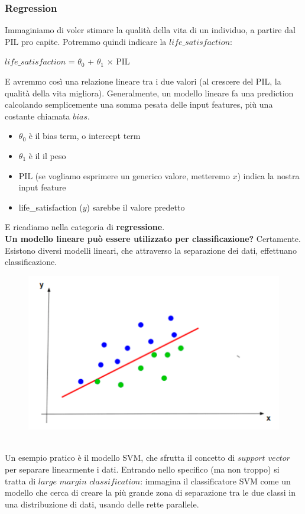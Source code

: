 \newpage

\subsubsection{Regression}
Immaginiamo di voler stimare la qualità della vita di un individuo, a partire dal PIL pro capite. Potremmo quindi indicare la $life\_satisfaction$:
\begin{center}
    $life\_satisfaction$ = $\theta_0$ + $\theta_1$ $\times$ PIL
\end{center}
E avremmo così una relazione lineare tra i due valori (al crescere del PIL, la qualità della vita migliora). Generalmente, un modello lineare fa una prediction calcolando semplicemente una somma pesata delle input features, più una costante chiamata $bias$. 
\begin{itemize}
    \item $\theta_0$ è il bias term, o intercept term
    \item $\theta_1$ è il il peso
    \item PIL (se vogliamo esprimere un generico valore, metteremo $x$) indica la nostra input feature
    \item life\_satisfaction ($y$) sarebbe il valore predetto
\end{itemize}
E ricadiamo nella categoria di \textbf{regressione}.
\\
\textbf{Un modello lineare può essere utilizzato per classificazione?} Certamente. Esistono diversi modelli lineari, che attraverso la separazione dei dati, effettuano classificazione.  
\\
\begin{figure}[th]
    \centering
    \includegraphics[scale=0.4]{ML/img/class lineare.png}
    \label{fig:linclass}
\end{figure}
\\
Un esempio pratico è il modello SVM, che sfrutta il concetto di $support$ $vector$ per separare linearmente i dati. Entrando nello specifico (ma non troppo) si tratta di $large$ $margin$ $classification$: immagina il classificatore SVM come un modello che cerca di creare la più grande zona di separazione tra le due classi in una distribuzione di dati, usando delle rette parallele. 
